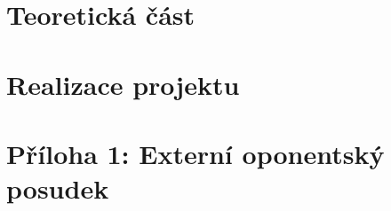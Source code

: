 \documentclass{template/socthesis}
\begin{document}
	\newpage
	\pagestyle{plain}
	
  \tableofcontents %
	
	\setcounter{figure}{0}
	\setcounter{table}{0}
	\newpage
	
	
	
	
	\chapter{Teoretická část}
	\label{chap:teoretical-part}
	
	
	
	

	
	
	\chapter{Realizace projektu}
	\label{chap:practical-part}
	
	
	
	
	
	
	
	
	
	
	
	
	
	\listoffigures
	
	\printbibliography[title=Literatura]
	
	
	
	
	\printglossaries

	\chapter{Příloha 1: Externí oponentský posudek}
\end{document}
